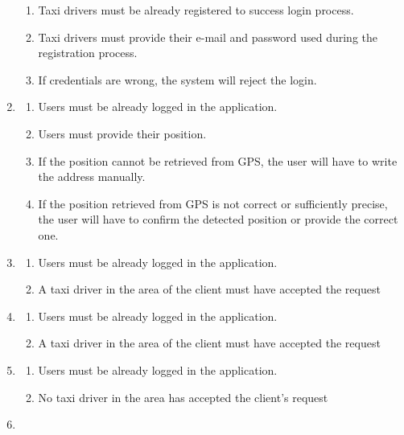 \documentclass[a4paper]{article}
\begin{document}
\begin{enumerate}[label=\bfseries G\arabic*:]
\begin{enumerate}[label=\bfseries R\arabic*:]
        \item Taxi drivers must be already registered to success login process.
        \item Taxi drivers must provide their e-mail and password used during the registration process.
        \item If credentials are wrong, the system will reject the login.
        \end{enumerate}
    \item
        \begin{enumerate}[label=\bfseries R\arabic*:]
        \item Users must be already logged in the application.
        \item Users must provide their position.
        \item If the position cannot be retrieved from GPS, the user will have to write the address manually.
        \item If the position retrieved from GPS is not correct or sufficiently precise, the user will have to confirm the detected position or provide the correct one.
        \end{enumerate}
    \item
        \begin{enumerate}[label=\bfseries R\arabic*:]
        \item Users must be already logged in the application.
        \item A taxi driver in the area of the client must have accepted the request
        \end{enumerate}
    \item
        \begin{enumerate}[label=\bfseries R\arabic*:]
        \item Users must be already logged in the application.
        \item A taxi driver in the area of the client must have accepted the request
        \end{enumerate}
    \item
        \begin{enumerate}[label=\bfseries R\arabic*:]
        \item Users must be already logged in the application.
        \item No taxi driver in the area has accepted the client's request
        \end{enumerate}
    \item
        \begin{enumerate}[label=\bfseries R\arabic*:]

\end{enumerate}
\end{enumerate}
\end{document}
